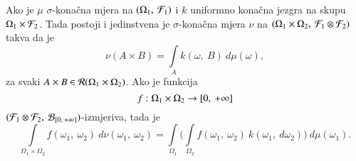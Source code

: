 \begin{zad} \label{zad:4.18}
    Ako je $\mu$ $\sigma$-kona\v cna mjera na $({\Omega_1}, \: {\mathcal{F}_1})$ i $k$ uniformno kona\v cna jezgra na skupu $\Omega_1 \times \mathcal{F}_2$.
    Tada postoji i jedinstvena je $\sigma$-kona\v cna mjera $\nu$ na $({\Omega_1 \times \Omega_2}, \: {\mathcal{F}_1 \otimes \mathcal{F}_2})$ takva da je
    \begin{equation*}
        \nu (A \times B) = \int\limits_A k(\omega, \: B) \: d \mu (\omega),
    \end{equation*}
    za svaki $A \times B \in \mathcal{R}({\Omega_1 \times \Omega_2})$.
    Ako je funkcija
    \begin{equation*}
        f:\Omega_1 \times \Omega_2 \to [{0}, \:{+\infty}]
    \end{equation*}
    $({\mathcal{F}_1 \otimes \mathcal{F}_2}, \: {\mathcal{B}_{[{0}, \:{+\infty}]}})$-izmjeriva, tada je
    \begin{equation*}
        \int\limits_{\Omega_1 \times \Omega_2} f(\omega_1, \: \omega_2) \: d \nu (\omega_1, \: \omega_2) = \int\limits_{\Omega_1} \Big( \int\limits_{\Omega_2} f(\omega_1, \: \omega_2) \: k(\omega_1, \: d \omega_2) \Big) \: d \mu (\omega_1).
    \end{equation*}
\end{zad}

